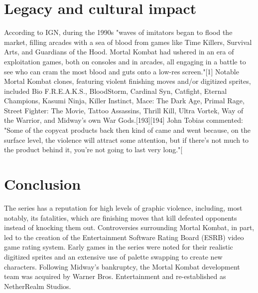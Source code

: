 \documentclass[12pt]{article}
\begin{document}
\section{Legacy and cultural impact}
According to IGN, during the 1990s "waves of imitators began to flood the market, filling arcades with a sea of blood from games like Time Killers, Survival Arts, and Guardians of the Hood. Mortal Kombat had ushered in an era of exploitation games, both on consoles and in arcades, all engaging in a battle to see who can cram the most blood and guts onto a low-res screen."[1] Notable Mortal Kombat clones, featuring violent finishing moves and/or digitized sprites, included Bio F.R.E.A.K.S., BloodStorm, Cardinal Syn, Catfight, Eternal Champions, Kasumi Ninja, Killer Instinct, Mace: The Dark Age, Primal Rage, Street Fighter: The Movie, Tattoo Assassins, Thrill Kill, Ultra Vortek, Way of the Warrior, and Midway's own War Gods.[193][194] John Tobias commented: "Some of the copycat products back then kind of came and went because, on the surface level, the violence will attract some attention, but if there's not much to the product behind it, you're not going to last very long."[

\section{Conclusion}
The series has a reputation for high levels of graphic violence, including, most notably, its fatalities, which are finishing moves that kill defeated opponents instead of knocking them out. Controversies surrounding Mortal Kombat, in part, led to the creation of the Entertainment Software Rating Board (ESRB) video game rating system. Early games in the series were noted for their realistic digitized sprites and an extensive use of palette swapping to create new characters. Following Midway's bankruptcy, the Mortal Kombat development team was acquired by Warner Bros. Entertainment and re-established as NetherRealm Studios.
\end{document}
